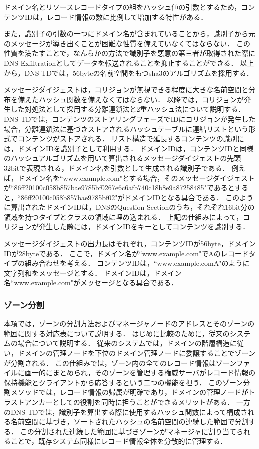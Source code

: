 ドメイン名とリソースレコードタイプの組をハッシュ値の引数とするため，コンテンツIDは，レコード情報の数に比例して増加する特性がある．

また，識別子の引数の一つにドメイン名が含まれていることから，識別子から元のメッセージが導き出くことが困難な性質を備えていなくてはならない．
この性質を満たすことで，なんらかの方法で識別子を悪意の第三者が取得された際にDNS Exfiltrationとしてデータを転送されることを抑止することができる．
以上から，DNS-TDでは，56byteの名前空間をもつsha3のアルゴリズムを採用する．

メッセージダイジェストは，コリジョンが無視できる程度に大きな名前空間と分布を備えたハッシュ関数を備えなくてはならない．
以降では，コリジョンが発生した対処法として採用する分離連鎖法と2重ハッシュ法について説明する．
DNS-TDでは，コンテンツのストアリングフェーズでIDにコリジョンが発生した場合，分離連鎖法に基づきストアされるハッシュテーブルに連結リストという形式でコンテンツがストアされる．
リスト構造で延長するコンテンツの識別には，ドメインIDを識別子として利用する．
ドメインIDは，コンテンツIDと同様のハッシュアルゴリズムを用いて算出されるメッセージダイジェストの先頭32bitで表現される，ドメイン名を引数として生成される識別子である．
例えば，ドメイン名を``www.example.com"とする場合，そのメッセージダイジェストが``86ff20100c058b857bae9785bf0267e6c6afb740c18b8e9a87258485"であるとすると，``86ff20100c058b857bae9785bf02"がドメインIDとなる具合である．
このように算出されたドメインIDは，DNSのQuestion Sectionのうち，それぞれ16bit分の領域を持つタイプとクラスの領域に埋め込まれる．
上記の仕組みによって，コリジョンが発生した際には，ドメインIDをキーとしてコンテンツを識別する．

メッセージダイジェストの出力長はそれぞれ，コンテンツIDが56byte，ドメインIDが28byteである．
ここで，ドメイン名が``www.example.com"でAのレコードタイプの組み合わせを考える．
コンテンツIDは，``www.example.comA"のように文字列和をメッセージとする．
ドメインIDは，ドメイン名``www.example.com"がメッセージとなる具合である．

\subsubsection{ゾーン分割}
本項では，ゾーンの分割方法およびマネージャノードのアドレスとそのゾーンの範囲に関する対応表について説明する．
はじめに比較のために，従来のシステムの場合について説明する．
従来のシステムでは，ドメインの階層構造に従い，ドメインの管理ノードを下位のドメイン管理ノードに委譲することでゾーンが分割される．
この仕組みでは，ゾーン内の全てのレコード情報はゾーンファイルに画一的にまとめられ，そのゾーンを管理する権威サーバがレコード情報の保持機能とクライアントから応答するという二つの機能を担う．
このゾーン分割メソッドでは，レコード情報の帰属が明確であり，ドメインの管理ノードがトラストアンカーとしての役割を同時に担うことができるメリットがある．
一方のDNS-TDでは，識別子を算出する際に使用するハッシュ関数によって構成される名前空間に基づき，ソートされたハッシュの名前空間の連続した範囲で分割する．
この分割された連続した範囲に基づきゾーンがマネージャに割り当てられることで，既存システム同様にレコード情報全体を分散的に管理する．

